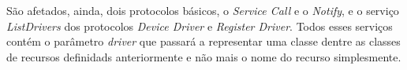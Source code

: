 São afetados, ainda, dois protocolos básicos, o \emph{Service Call} e o \emph{Notify}, e o serviço \emph{ListDrivers} dos protocolos \emph{Device Driver} e \emph{Register Driver}. Todos esses serviços contém o parâmetro \emph{driver} que passará a representar uma classe dentre as classes de recursos definidads anteriormente e não mais o nome do recurso simplesmente.